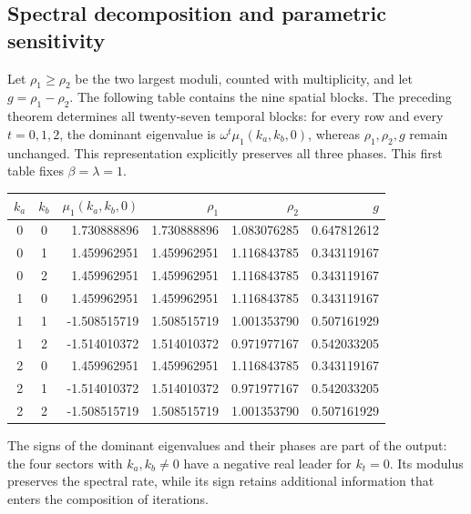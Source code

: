\subsection{Spectral decomposition and parametric sensitivity}
\label{iii:hist:espectros}

Let $\rho_1\geq\rho_2$ be the two largest moduli, counted with
multiplicity, and let $g=\rho_1-\rho_2$. The following table contains
the nine spatial blocks. The preceding theorem determines all
twenty-seven temporal blocks: for every row and every $t=0,1,2$, the
dominant eigenvalue is $\omega^t\mu_1(k_a,k_b,0)$, whereas
$\rho_1,\rho_2,g$ remain unchanged. This representation explicitly
preserves all three phases. This first table fixes $\beta=\lambda=1$.

\begin{center}
\small
\begin{tabular}{ccrrrr}
\toprule
$k_a$&$k_b$&$\mu_1(k_a,k_b,0)$&$\rho_1$&$\rho_2$&$g$\\
\midrule
0&0&1.730888896&1.730888896&1.083076285&0.647812612\\
0&1&1.459962951&1.459962951&1.116843785&0.343119167\\
0&2&1.459962951&1.459962951&1.116843785&0.343119167\\
1&0&1.459962951&1.459962951&1.116843785&0.343119167\\
1&1&-1.508515719&1.508515719&1.001353790&0.507161929\\
1&2&-1.514010372&1.514010372&0.971977167&0.542033205\\
2&0&1.459962951&1.459962951&1.116843785&0.343119167\\
2&1&-1.514010372&1.514010372&0.971977167&0.542033205\\
2&2&-1.508515719&1.508515719&1.001353790&0.507161929\\
\bottomrule
\end{tabular}
\end{center}

The signs of the dominant eigenvalues and their phases are part of the
output: the four sectors with $k_a,k_b\ne0$ have a negative real leader for
$k_t=0$. Its modulus preserves the spectral rate, while its sign retains
additional information that enters the composition of iterations.

